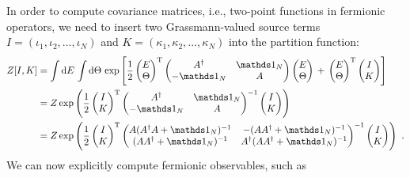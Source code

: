 \documentclass[letter]{article}
\newcommand{\intd}[1]{\int\mathrm{d}#1\,}
\begin{document}
In order to compute covariance matrices, i.e., two-point functions in fermionic operators, we need to insert two Grassmann-valued source terms $I=(\iota_1,\iota_2,\dots,\iota_{N})$ and $K=(\kappa_1,\kappa_2,\dots,\kappa_{N})$  into the partition function:
\begin{align}
Z[I,K] &= \intd{E}\intd{\Theta}
\exp\left[
\frac{1}{2}
\begin{pmatrix}
E \\
\Theta
\end{pmatrix}^\mathrm{T}
\begin{pmatrix}
A^\dagger & \id_N \\
-\id_N    & A
\end{pmatrix}
\begin{pmatrix}
E \\
\Theta
\end{pmatrix} 
\,+\, 
\begin{pmatrix}
E \\
\Theta
\end{pmatrix}^\mathrm{T}
\begin{pmatrix}
I \\
K 
\end{pmatrix}
\right] \nonumber\\
&= Z \exp\left(\frac{1}{2} \begin{pmatrix}
I \\
K 
\end{pmatrix}^\mathrm{T}
\begin{pmatrix}
A^\dagger & \id_N \\
-\id_N    & A
\end{pmatrix}^{-1}
\begin{pmatrix}
I \\
K 
\end{pmatrix}
\right)  \nonumber\\
&=
Z \exp\left(
\frac{1}{2} 
\begin{pmatrix}
I \\
K 
\end{pmatrix}^\mathrm{T}
\begin{pmatrix}
A (A^\dagger A + \id_N)^{-1} & -(A A^\dagger + \id_N)^{-1} \\
(A A^\dagger + \id_N)^{-1}  & A^\dagger (A A^\dagger + \id_N)^{-1}
\end{pmatrix}^{-1}
\begin{pmatrix}
I \\
K 
\end{pmatrix}
\right) \ .
\end{align}
We can now explicitly compute fermionic observables, such as
\end{document}

